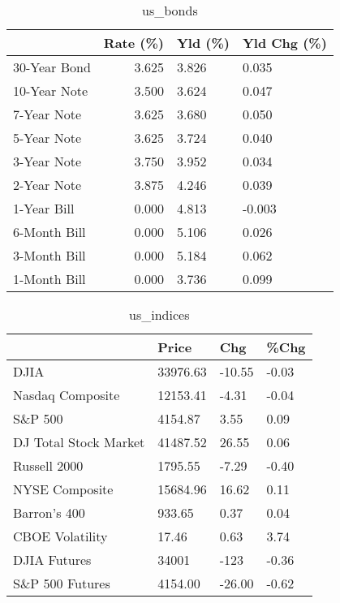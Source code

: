 \documentclass{article}%
\begin{document}
%


\begin{table}[htbp]%
\caption{us\_bonds}%
\centering%
\begin{adjustbox}{width=1\textwidth}%
\begin{tabular}{lrll}
\toprule
             &  Rate (\%) & Yld (\%) & Yld Chg (\%) \\
\midrule
30-Year Bond &     3.625 &   3.826 &       0.035 \\
10-Year Note &     3.500 &   3.624 &       0.047 \\
 7-Year Note &     3.625 &   3.680 &       0.050 \\
 5-Year Note &     3.625 &   3.724 &       0.040 \\
 3-Year Note &     3.750 &   3.952 &       0.034 \\
 2-Year Note &     3.875 &   4.246 &       0.039 \\
 1-Year Bill &     0.000 &   4.813 &      -0.003 \\
6-Month Bill &     0.000 &   5.106 &       0.026 \\
3-Month Bill &     0.000 &   5.184 &       0.062 \\
1-Month Bill &     0.000 &   3.736 &       0.099 \\
\bottomrule
\end{tabular}
%
\end{adjustbox}%
\end{table}

%


\begin{table}[htbp]%
\caption{us\_indices}%
\centering%
\begin{adjustbox}{width=1\textwidth}%
\begin{tabular}{llll}
\toprule
                      &    Price &    Chg &  \%Chg \\
\midrule
                 DJIA & 33976.63 & -10.55 & -0.03 \\
     Nasdaq Composite & 12153.41 &  -4.31 & -0.04 \\
              S\&P 500 &  4154.87 &   3.55 &  0.09 \\
DJ Total Stock Market & 41487.52 &  26.55 &  0.06 \\
         Russell 2000 &  1795.55 &  -7.29 & -0.40 \\
       NYSE Composite & 15684.96 &  16.62 &  0.11 \\
         Barron's 400 &   933.65 &   0.37 &  0.04 \\
      CBOE Volatility &    17.46 &   0.63 &  3.74 \\
         DJIA Futures &    34001 &   -123 & -0.36 \\
      S\&P 500 Futures &  4154.00 & -26.00 & -0.62 \\
\bottomrule
\end{tabular}
%
\end{adjustbox}%
\end{table}
\end{document}
